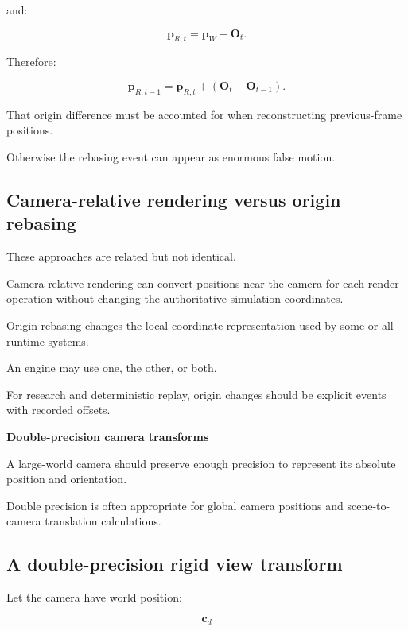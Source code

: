 and:

\[
 \mathbf p_{R,t} = \mathbf p_W-\mathbf O_t.
\]

Therefore:

\[
 \boxed{ \mathbf p_{R,t-1} = \mathbf p_{R,t} + (\mathbf O_t-\mathbf O_{t-1}) }.
\]

That origin difference must be accounted for when reconstructing previous-frame positions.

Otherwise the rebasing event can appear as enormous false motion.

\subsection{Camera-relative rendering versus origin rebasing}\label{02-foundations-ii-ch036-camera-relative-rendering-versus-origin-rebasing}

\hypertarget{02-foundations-ii-ch036-camera-relative-rendering-versus-origin-rebasing}{}

These approaches are related but not identical.

Camera-relative rendering can convert positions near the camera for each render operation without changing the authoritative simulation coordinates.

Origin rebasing changes the local coordinate representation used by some or all runtime systems.

An engine may use one, the other, or both.

For research and deterministic replay, origin changes should be explicit events with recorded offsets.

\textbf{Double-precision camera transforms}

A large-world camera should preserve enough precision to represent its absolute position and orientation.

Double precision is often appropriate for global camera positions and scene-to-camera translation calculations.

\subsection{A double-precision rigid view transform}\label{02-foundations-ii-ch036-a-double-precision-rigid-view-transform}

\hypertarget{02-foundations-ii-ch036-a-double-precision-rigid-view-transform}{}

Let the camera have world position:

\[
 \mathbf c_d
\]

